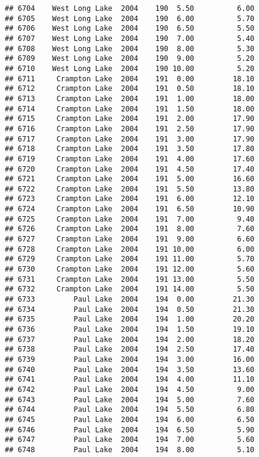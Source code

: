 \documentclass[
]{article}
\begin{document}
\begin{verbatim}
## 6704    West Long Lake  2004    190  5.50          6.00
## 6705    West Long Lake  2004    190  6.00          5.70
## 6706    West Long Lake  2004    190  6.50          5.50
## 6707    West Long Lake  2004    190  7.00          5.40
## 6708    West Long Lake  2004    190  8.00          5.30
## 6709    West Long Lake  2004    190  9.00          5.20
## 6710    West Long Lake  2004    190 10.00          5.20
## 6711     Crampton Lake  2004    191  0.00         18.10
## 6712     Crampton Lake  2004    191  0.50         18.10
## 6713     Crampton Lake  2004    191  1.00         18.00
## 6714     Crampton Lake  2004    191  1.50         18.00
## 6715     Crampton Lake  2004    191  2.00         17.90
## 6716     Crampton Lake  2004    191  2.50         17.90
## 6717     Crampton Lake  2004    191  3.00         17.90
## 6718     Crampton Lake  2004    191  3.50         17.80
## 6719     Crampton Lake  2004    191  4.00         17.60
## 6720     Crampton Lake  2004    191  4.50         17.40
## 6721     Crampton Lake  2004    191  5.00         16.60
## 6722     Crampton Lake  2004    191  5.50         13.80
## 6723     Crampton Lake  2004    191  6.00         12.10
## 6724     Crampton Lake  2004    191  6.50         10.90
## 6725     Crampton Lake  2004    191  7.00          9.40
## 6726     Crampton Lake  2004    191  8.00          7.60
## 6727     Crampton Lake  2004    191  9.00          6.60
## 6728     Crampton Lake  2004    191 10.00          6.00
## 6729     Crampton Lake  2004    191 11.00          5.70
## 6730     Crampton Lake  2004    191 12.00          5.60
## 6731     Crampton Lake  2004    191 13.00          5.50
## 6732     Crampton Lake  2004    191 14.00          5.50
## 6733         Paul Lake  2004    194  0.00         21.30
## 6734         Paul Lake  2004    194  0.50         21.30
## 6735         Paul Lake  2004    194  1.00         20.20
## 6736         Paul Lake  2004    194  1.50         19.10
## 6737         Paul Lake  2004    194  2.00         18.20
## 6738         Paul Lake  2004    194  2.50         17.40
## 6739         Paul Lake  2004    194  3.00         16.00
## 6740         Paul Lake  2004    194  3.50         13.60
## 6741         Paul Lake  2004    194  4.00         11.10
## 6742         Paul Lake  2004    194  4.50          9.00
## 6743         Paul Lake  2004    194  5.00          7.60
## 6744         Paul Lake  2004    194  5.50          6.80
## 6745         Paul Lake  2004    194  6.00          6.50
## 6746         Paul Lake  2004    194  6.50          5.90
## 6747         Paul Lake  2004    194  7.00          5.60
## 6748         Paul Lake  2004    194  8.00          5.10

\end{verbatim}
\end{document}
